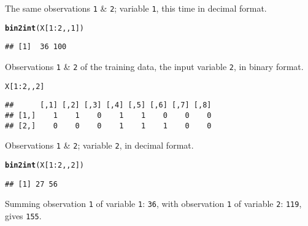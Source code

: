 \documentclass[english,article]{article}\usepackage[]{graphicx}\usepackage[]{color}
\makeatletter
\newcommand{\hlnum}[1]{\textcolor[rgb]{0.686,0.059,0.569}{#1}}%
\newcommand{\hlopt}[1]{\textcolor[rgb]{0,0,0}{#1}}%
\newcommand{\hlstd}[1]{\textcolor[rgb]{0.345,0.345,0.345}{#1}}%
\newcommand{\hlkwd}[1]{\textcolor[rgb]{0.737,0.353,0.396}{\textbf{#1}}}%
\newenvironment{kframe}{%
 \def\at@end@of@kframe{}%
 \ifinner\ifhmode%
  \def\at@end@of@kframe{\end{minipage}}%
  \begin{minipage}{\columnwidth}%
 \fi\fi%
 \def\FrameCommand##1{\hskip\@totalleftmargin \hskip-\fboxsep
 \colorbox{shadecolor}{##1}\hskip-\fboxsep
     \hskip-\linewidth \hskip-\@totalleftmargin \hskip\columnwidth}%
 \MakeFramed {\advance\hsize-\width
   \@totalleftmargin\z@ \linewidth\hsize
   \@setminipage}}%
 {\par\unskip\endMakeFramed%
 \at@end@of@kframe}
\newenvironment{knitrout}{}{} %
\providecommand*{\code}[1]{\texttt{#1}}
\makeatother
\begin{document}
The same observations \code{1} \& \code{2}; variable \code{1},
this time in decimal format.

\begin{knitrout}
\color{fgcolor}\begin{kframe}
\begin{alltt}
\hlkwd{bin2int}\hlstd{( X[}\hlnum{1}\hlopt{:}\hlnum{2}\hlstd{,,}\hlnum{1}\hlstd{] )}
\end{alltt}
\begin{verbatim}
## [1]  36 100
\end{verbatim}
\end{kframe}
\end{knitrout}

Observations \code{1} \& \code{2} of the training data, the input
variable \code{2}, in binary format.

\begin{knitrout}
\color{fgcolor}\begin{kframe}
\begin{alltt}
\hlstd{X[}\hlnum{1}\hlopt{:}\hlnum{2}\hlstd{,,}\hlnum{2}\hlstd{]}
\end{alltt}
\begin{verbatim}
##      [,1] [,2] [,3] [,4] [,5] [,6] [,7] [,8]
## [1,]    1    1    0    1    1    0    0    0
## [2,]    0    0    0    1    1    1    0    0
\end{verbatim}
\end{kframe}
\end{knitrout}

Observations \code{1} \& \code{2}; variable \code{2}, in decimal
format.

\begin{knitrout}
\color{fgcolor}\begin{kframe}
\begin{alltt}
\hlkwd{bin2int}\hlstd{( X[}\hlnum{1}\hlopt{:}\hlnum{2}\hlstd{,,}\hlnum{2}\hlstd{] )}
\end{alltt}
\begin{verbatim}
## [1] 27 56
\end{verbatim}
\end{kframe}
\end{knitrout}

Summing observation \code{1} of variable \code{1}: \code{36}, with
observation \code{1} of variable \code{2}: \code{119}, gives \code{155}.
\end{document}
